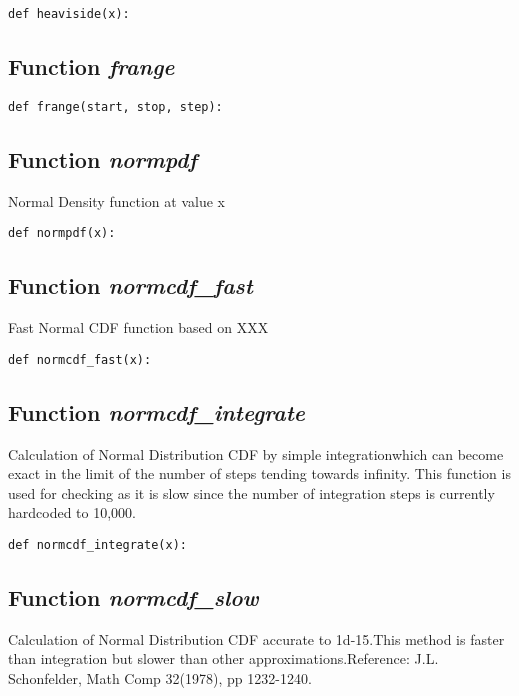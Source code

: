 \documentclass[twoside,11pt]{book}
\begin{document}
\begin{lstlisting}
def heaviside(x):
\end{lstlisting}

\subsection{Function {\it frange}}


\begin{lstlisting}
def frange(start, stop, step):
\end{lstlisting}

\subsection{Function {\it normpdf}}
Normal Density function at value x

\begin{lstlisting}
def normpdf(x):
\end{lstlisting}

\subsection{Function {\it normcdf\_fast}}
Fast Normal CDF function based on XXX 

\begin{lstlisting}
def normcdf_fast(x):
\end{lstlisting}

\subsection{Function {\it normcdf\_integrate}}
Calculation of Normal Distribution CDF by simple integrationwhich can become exact in the limit of the number of steps tending towards infinity. This function is used for checking as it is slow since the number of integration steps is currently hardcoded to 10,000.

\begin{lstlisting}
def normcdf_integrate(x):
\end{lstlisting}

\subsection{Function {\it normcdf\_slow}}
Calculation of Normal Distribution CDF accurate to 1d-15.This method is faster than integration but slower than other approximations.Reference: J.L. Schonfelder, Math Comp 32(1978), pp 1232-1240. 
\end{document}
